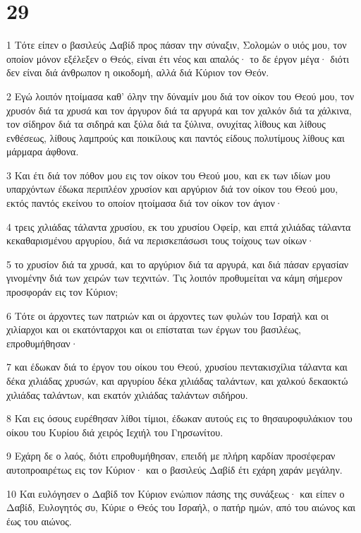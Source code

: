 \chapter{29}

\par 1 Τότε είπεν ο βασιλεύς Δαβίδ προς πάσαν την σύναξιν, Σολομών ο υιός μου, τον οποίον μόνον εξέλεξεν ο Θεός, είναι έτι νέος και απαλός· το δε έργον μέγα· διότι δεν είναι διά άνθρωπον η οικοδομή, αλλά διά Κύριον τον Θεόν.
\par 2 Εγώ λοιπόν ητοίμασα καθ' όλην την δύναμίν μου διά τον οίκον του Θεού μου, τον χρυσόν διά τα χρυσά και τον άργυρον διά τα αργυρά και τον χαλκόν διά τα χάλκινα, τον σίδηρον διά τα σιδηρά και ξύλα διά τα ξύλινα, ονυχίτας λίθους και λίθους ενθέσεως, λίθους λαμπρούς και ποικίλους και παντός είδους πολυτίμους λίθους και μάρμαρα άφθονα.
\par 3 Και έτι διά τον πόθον μου εις τον οίκον του Θεού μου, και εκ των ιδίων μου υπαρχόντων έδωκα περιπλέον χρυσίον και αργύριον διά τον οίκον του Θεού μου, εκτός παντός εκείνου το οποίον ητοίμασα διά τον οίκον τον άγιον·
\par 4 τρεις χιλιάδας τάλαντα χρυσίου, εκ του χρυσίου Οφείρ, και επτά χιλιάδας τάλαντα κεκαθαρισμένου αργυρίου, διά να περισκεπάσωσι τους τοίχους των οίκων·
\par 5 το χρυσίον διά τα χρυσά, και το αργύριον διά τα αργυρά, και διά πάσαν εργασίαν γινομένην διά των χειρών των τεχνιτών. Τις λοιπόν προθυμείται να κάμη σήμερον προσφοράν εις τον Κύριον;
\par 6 Τότε οι άρχοντες των πατριών και οι άρχοντες των φυλών του Ισραήλ και οι χιλίαρχοι και οι εκατόνταρχοι και οι επίσταται των έργων του βασιλέως, επροθυμήθησαν·
\par 7 και έδωκαν διά το έργον του οίκου του Θεού, χρυσίου πεντακισχίλια τάλαντα και δέκα χιλιάδας χρυσών, και αργυρίου δέκα χιλιάδας ταλάντων, και χαλκού δεκαοκτώ χιλιάδας ταλάντων, και εκατόν χιλιάδας ταλάντων σιδήρου.
\par 8 Και εις όσους ευρέθησαν λίθοι τίμιοι, έδωκαν αυτούς εις το θησαυροφυλάκιον του οίκου του Κυρίου διά χειρός Ιεχιήλ του Γηρσωνίτου.
\par 9 Εχάρη δε ο λαός, διότι επροθυμήθησαν, επειδή με πλήρη καρδίαν προσέφεραν αυτοπροαιρέτως εις τον Κύριον· και ο βασιλεύς Δαβίδ έτι εχάρη χαράν μεγάλην.
\par 10 Και ευλόγησεν ο Δαβίδ τον Κύριον ενώπιον πάσης της συνάξεως· και είπεν ο Δαβίδ, Ευλογητός συ, Κύριε ο Θεός του Ισραήλ, ο πατήρ ημών, από του αιώνος και έως του αιώνος.
